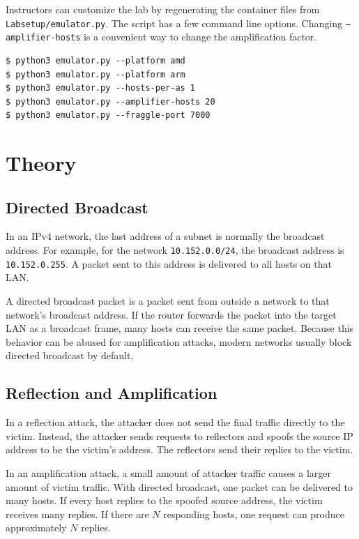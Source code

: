 Instructors can customize the lab by regenerating the container files from
\texttt{Labsetup/emulator.py}. The script has a few command
line options. Changing \texttt{--amplifier-hosts} is a convenient way to change the
amplification factor. 

\begin{lstlisting}
$ python3 emulator.py --platform amd
$ python3 emulator.py --platform arm
$ python3 emulator.py --hosts-per-as 1
$ python3 emulator.py --amplifier-hosts 20
$ python3 emulator.py --fraggle-port 7000
\end{lstlisting}



\section{Theory}
\label{sec:theory}

\subsection{Directed Broadcast}

In an IPv4 network, the last address of a subnet is normally the broadcast
address. For example, for the network \texttt{10.152.0.0/24}, the broadcast
address is \texttt{10.152.0.255}. A packet sent to this address is delivered to
all hosts on that LAN.

A directed broadcast packet is a packet sent from outside a network to that
network's broadcast address. If the router forwards the packet into the target
LAN as a broadcast frame, many hosts can receive the same packet. Because this
behavior can be abused for amplification attacks, modern networks usually block
directed broadcast by default.


\subsection{Reflection and Amplification}

In a reflection attack, the attacker does not send the final traffic directly to
the victim. Instead, the attacker sends requests to reflectors and spoofs the
source IP address to be the victim's address. The reflectors send their replies
to the victim.

In an amplification attack, a small amount of attacker traffic causes a larger
amount of victim traffic. With directed broadcast, one packet can be delivered
to many hosts. If every host replies to the spoofed source address, the victim
receives many replies. If there are \(N\) responding hosts, one request can
produce approximately \(N\) replies.





